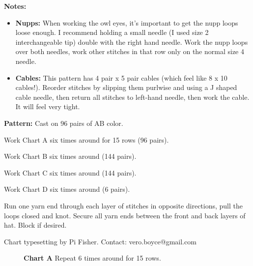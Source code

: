 \documentclass[11pt]{article}
\begin{document}
\smallskip
\textbf{Notes:}
\begin{itemize}
	\item \textbf{Nupps:} When working the owl eyes, it's important to get the nupp loops loose enough. I recommend holding a small needle (I used size 2 interchangeable tip) double with the right hand needle. Work the nupp loops over both needles, work other stitches in that row only on the normal size 4 needle. 
	\item \textbf{Cables:} This pattern has 4 pair x 5 pair cables (which feel like 8 x 10 cables!). Reorder stitches by slipping them purlwise and using a J shaped cable needle, then return all stitches to left-hand needle, then work the cable. It will feel very tight. 
\end{itemize}

\smallskip

\textbf{Pattern:}
Cast on 96 pairs of AB color. 

Work Chart A six times around for 15 rows (96 pairs). 

Work Chart B six times around (144 pairs). 

Work Chart C six times around (144 pairs). 

Work Chart D six times around (6 pairs). 

Run one yarn end through each layer of stitches in opposite directions, pull the loops closed and knot. Secure all yarn ends between the front and back layers of hat.  Block if desired. 


\doclicenseThis Chart typesetting by Pi Fisher. Contact: vero.boyce@gmail.com

\newpage

\begin{figure}
	\centering
{} 
\caption*{\textbf{Chart A} Repeat 6 times around for 15 rows.\\}

\end{figure}
\end{document}
